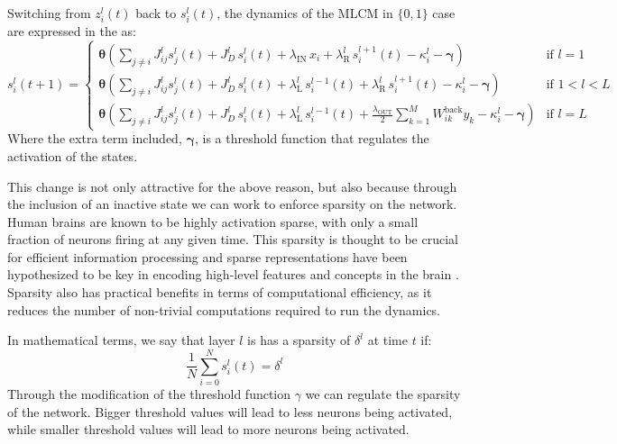 \documentclass[a4paper,12pt]{report}
\begin{document}
Switching from $z_i^l(t)$ back to $s_i^l(t)$, the dynamics of the MLCM in $\{0, 1\}$ 
case are expressed in the as:
\begin{equation}
    s_i^l(t+1) = 
    \begin{cases}
        \boldsymbol{\theta}\left(\displaystyle\sum_{j \neq i} J_{ij}^l s_j^l(t) + 
        J_D^l\, s_i^l(t) + \lambda_{\mathrm{IN}}\, x_i + \lambda_{\mathrm{R}}^l \, 
        s_i^{l+1}(t) - \kappa_i^l - \boldsymbol{\gamma}
        \right) & \text{if } l = 1 \\[2ex]
        \boldsymbol{\theta}\left(\displaystyle\sum_{j \neq i} J_{ij}^l s_j^l(t) + 
        J_D^l\, s_i^l(t) + \lambda_{\mathrm{L}}^l\, s_i^{l-1}(t) + 
        \lambda_{\mathrm{R}}^l\, s_i^{l+1}(t)  - \kappa_i^l - \boldsymbol{\gamma}
        \right) & \text{if } 1 < l < L \\[2ex]
        \boldsymbol{\theta}\left(\displaystyle\sum_{j \neq i} J_{ij}^l s_j^l(t) + 
        J_D^l\, s_i^l(t) + \lambda_{\mathrm{L}}^l\, s_i^{l-1}(t) +
        \frac{\lambda_{\mathrm{OUT}}}{2} \sum_{k=1}^{M} W_{ik}^{\mathrm{back}} y_k  - 
        \kappa_i^l - \boldsymbol{\gamma}\right) 
        & \text{if } l = L
    \end{cases}
    \label{eq:si_sparse_update}
\end{equation}
Where the extra term included, $\boldsymbol{\gamma}$, is a threshold function 
that regulates the activation of the states.

This change is not only attractive for the above reason, but also because through the 
inclusion of an inactive state we can work to enforce sparsity on the network. Human 
brains are known to be highly activation sparse, with only a small fraction of neurons 
firing at any given time. This sparsity is thought to be crucial for efficient 
information processing and sparse representations have been hypothesized to be key in 
encoding high-level features and concepts in the brain \cite{JAASKELAINEN2022119633}.\\
Sparsity also has practical benefits in terms of computational efficiency, as it 
reduces the number of non-trivial computations required to run the dynamics.

In mathematical terms, we say that layer $l$ is has a sparsity of $\delta^l$ at time 
$t$ if: 
$$\frac{1}{N} \sum_{i=0}^{N} s_i^l(t) = \delta^l$$
Through the modification of the threshold function $\gamma$ we can regulate the 
sparsity of the network. Bigger threshold values will lead to less neurons being activated,
while smaller threshold values will lead to more neurons being activated.
\end{document}
